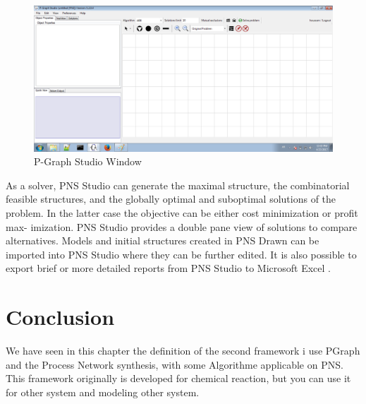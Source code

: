\begin{figure}[th]
	\centering  %
 	\includegraphics[scale=0.44]{ch3/img/pgraph}
	\caption{\label{fig:pgraphstudio)}P-Graph Studio Window}
\end{figure}  

As a solver, PNS Studio can generate the maximal structure, the combinatorial feasible structures, and the globally optimal
and suboptimal solutions of the problem. In the latter case the objective can be either cost minimization or profit max-
imization. PNS Studio provides a double pane view of solutions to compare alternatives.
Models and initial structures created in PNS Drawn can be imported into PNS Studio where they can be further edited. It
is also possible to export brief or more detailed reports from PNS Studio to Microsoft Excel \cite{ch3-pgraph}.
 
 
\section{Conclusion}
We have seen in this chapter the definition of the second framework i use
PGraph and the Process Network synthesis, with some Algorithme applicable on PNS.
This framework originally is developed for chemical reaction, but you can use it for other system and modeling other system.

